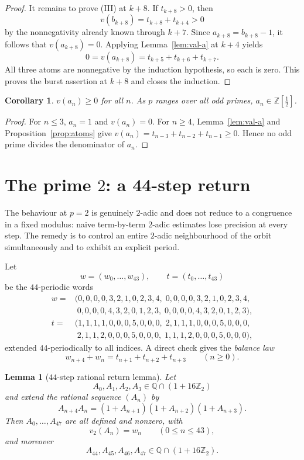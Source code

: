 \documentclass[11pt]{article}
\newtheorem{lemma}{Lemma}
\newtheorem{corollary}[theorem]{Corollary}
\theoremstyle{remark}
\newcommand{\Z}{\mathbb{Z}}
\newcommand{\Q}{\mathbb{Q}}
\newcommand{\Ztwo}{\mathbb{Z}_2}
\newcommand{\vt}{v_2}
\begin{document}
\begin{proof}
It remains to prove (III) at $k+8$.  If $t_{k+8}>0$, then
\[
v(b_{k+8})=t_{k+8}+t_{k+4}>0
\]
by the nonnegativity already known through $k+7$.  Since
$a_{k+8}=b_{k+8}-1$, it follows that $v(a_{k+8})=0$.  Applying
Lemma~\ref{lem:val-a} at $k+4$ yields
\[
0=v(a_{k+8})=t_{k+5}+t_{k+6}+t_{k+7}.
\]
All three atoms are nonnegative by the induction hypothesis, so each is zero.
This proves the burst assertion at $k+8$ and closes the induction.
\end{proof}

\begin{corollary}\label{cor:odd}
$v(a_n)\ge0$ for all $n$.  As $p$ ranges over all odd primes,
$a_n\in\Z[\tfrac12]$.
\end{corollary}
\begin{proof}
For $n\le3$, $a_n=1$ and $v(a_n)=0$.  For $n\ge4$,
Lemma~\ref{lem:val-a} and Proposition~\ref{prop:atoms} give
$v(a_n)=t_{n-3}+t_{n-2}+t_{n-1}\ge0$.  Hence no odd prime divides the
denominator of $a_n$.
\end{proof}

\section{The prime $2$: a 44-step return}\label{sec:two}

The behaviour at $p=2$ is genuinely $2$-adic and does not reduce to a
congruence in a fixed modulus: naive term-by-term $2$-adic estimates lose
precision at every step.  The remedy is to control an entire $2$-adic
neighbourhood of the orbit simultaneously and to exhibit an explicit period.

Let
\[
w=(w_0,\dots,w_{43}),\qquad t=(t_0,\dots,t_{43})
\]
be the $44$-periodic words
\begin{align*}
w={}&(0,0,0,0,3,2,1,0,2,3,4,\;
        0,0,0,0,3,2,1,0,2,3,4,\\
     &\;0,0,0,0,4,3,2,0,1,2,3,\;
        0,0,0,0,4,3,2,0,1,2,3),\\[2pt]
t={}&(1,1,1,1,0,0,0,5,0,0,0,\;
        2,1,1,1,0,0,0,5,0,0,0,\\
     &\;2,1,1,2,0,0,0,5,0,0,0,\;
        1,1,1,2,0,0,0,5,0,0,0),
\end{align*}
extended $44$-periodically to all indices.  A direct check gives the
\emph{balance law}
\begin{equation}
w_{n+4}+w_n=t_{n+1}+t_{n+2}+t_{n+3}\qquad(n\ge0).
\label{eq:balance}
\end{equation}

\begin{lemma}[$44$-step rational return lemma]\label{lem:return}
Let
\[
A_0,A_1,A_2,A_3\in\Q\cap(1+16\Ztwo)
\]
and extend the rational sequence $(A_n)$ by
\[
A_{n+4}A_n=(1+A_{n+1})(1+A_{n+2})(1+A_{n+3}).
\]
Then $A_0,\dots,A_{47}$ are all defined and nonzero, with
\[
\vt(A_n)=w_n\qquad(0\le n\le43),
\]
and moreover
\[
A_{44},A_{45},A_{46},A_{47}\in\Q\cap(1+16\Ztwo).
\]
\end{lemma}
\end{document}
